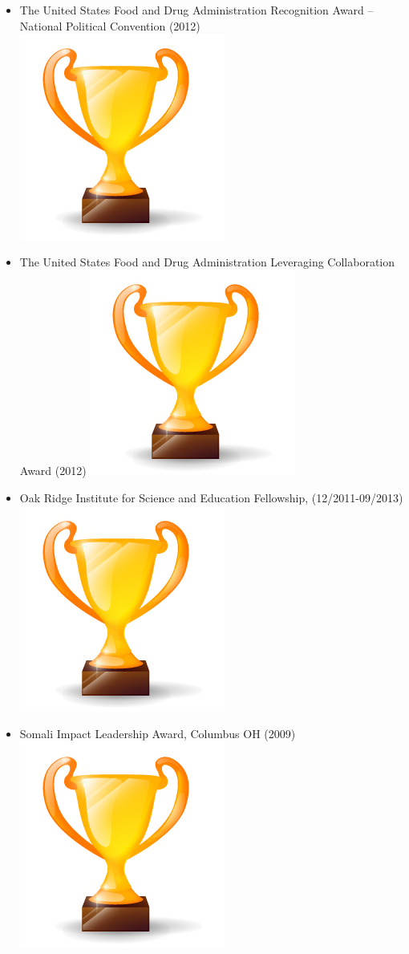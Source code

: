\documentclass[letterpaper]{twentysecondcv} %
\begin{document}
{{\begin{itemize}
\item	The United States Food and Drug Administration Recognition Award – National Political Convention (2012)	\includegraphics[scale=0.05]{img/trophy.png}
\item	The United States Food and Drug Administration Leveraging Collaboration Award (2012)	\includegraphics[scale=0.05]{img/trophy.png}
\item	Oak Ridge Institute for Science and Education Fellowship, (12/2011-09/2013)	\includegraphics[scale=0.05]{img/trophy.png}
\item	Somali Impact Leadership Award, Columbus OH (2009) 	\includegraphics[scale=0.05]{img/trophy.png}

\end{itemize}}}
\end{document}
